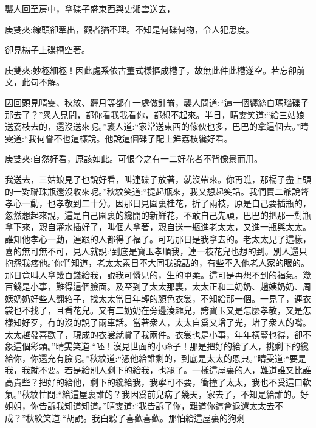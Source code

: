 \begin{parag}
    襲人回至房中，拿碟子盛東西與史湘雲送去，\begin{note}庚雙夾:線頭卻牽出，觀者猶不理。不知是何碟何物，令人犯思度。\end{note}卻見槅子上碟槽空著。\begin{note}庚雙夾:妙極細極！因此處系依古董式樣摳成槽子，故無此件此槽遂空。若忘卻前文，此句不解。\end{note}因回頭見晴雯、秋紋、麝月等都在一處做針黹，襲人問道:“這一個纏絲白瑪瑙碟子那去了？”衆人見問，都你看我我看你，都想不起來。半日，晴雯笑道:“給三姑娘送荔枝去的，還沒送來呢。”襲人道:“家常送東西的傢伙也多，巴巴的拿這個去。”晴雯道:“我何嘗不也這樣說。他說這個碟子配上鮮荔枝纔好看。\begin{note}庚雙夾:自然好看，原該如此。可恨今之有一二好花者不背像景而用。\end{note}我送去，三姑娘見了也說好看，叫連碟子放著，就沒帶來。你再瞧，那槅子盡上頭的一對聯珠瓶還沒收來呢。”秋紋笑道:“提起瓶來，我又想起笑話。我們寶二爺說聲孝心一動，也孝敬到二十分。因那日見園裏桂花，折了兩枝，原是自己要插瓶的，忽然想起來說，這是自己園裏的纔開的新鮮花，不敢自己先頑，巴巴的把那一對瓶拿下來，親自灌水插好了，叫個人拿著，親自送一瓶進老太太，又進一瓶與太太。誰知他孝心一動，連跟的人都得了福了。可巧那日是我拿去的。老太太見了這樣，喜的無可無不可，見人就說:‘到底是寶玉孝順我，連一枝花兒也想的到。別人還只抱怨我疼他。’你們知道，老太太素日不大同我說話的，有些不入他老人家的眼的。那日竟叫人拿幾百錢給我，說我可憐見的，生的單柔。這可是再想不到的福氣。幾百錢是小事，難得這個臉面。及至到了太太那裏，太太正和二奶奶、趙姨奶奶、周姨奶奶好些人翻箱子，找太太當日年輕的顏色衣裳，不知給那一個。一見了，連衣裳也不找了，且看花兒。又有二奶奶在旁邊湊趣兒，誇寶玉又是怎麼孝敬，又是怎樣知好歹，有的沒的說了兩車話。當著衆人，太太自爲又增了光，堵了衆人的嘴。太太越發喜歡了，現成的衣裳就賞了我兩件。衣裳也是小事，年年橫豎也得，卻不象這個彩頭。”晴雯笑道:“呸！沒見世面的小蹄子！那是把好的給了人，挑剩下的纔給你，你還充有臉呢。”秋紋道:“憑他給誰剩的，到底是太太的恩典。”晴雯道:“要是我，我就不要。若是給別人剩下的給我，也罷了。一樣這屋裏的人，難道誰又比誰高貴些？把好的給他，剩下的纔給我，我寧可不要，衝撞了太太，我也不受這口軟氣。”秋紋忙問:“給這屋裏誰的？我因爲前兒病了幾天，家去了，不知是給誰的。好姐姐，你告訴我知道知道。”晴雯道:“我告訴了你，難道你這會退還太太去不成？”秋紋笑道:“胡說。我白聽了喜歡喜歡。那怕給這屋裏的狗剩
\end{parag}
